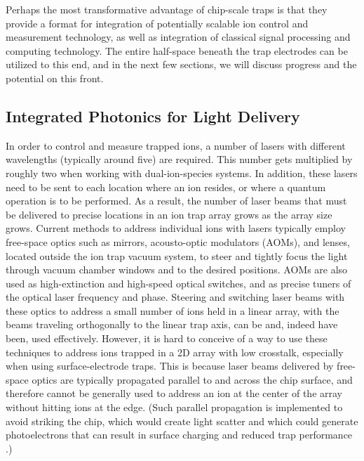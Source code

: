 \documentclass[%
reprint,
 amsmath,amssymb,
]{revtex4-1}
\begin{document}
Perhaps the most transformative advantage of chip-scale traps is that they provide a format for integration of potentially scalable ion control and measurement technology, as well as integration of classical signal processing and computing technology.  The entire half-space beneath the trap electrodes can be utilized to this end, and in the next few sections, we will discuss progress and the potential on this front.

    \subsection{Integrated Photonics for Light Delivery}
    \label{IntPhot}
In order to control and measure trapped ions, a number of lasers with different wavelengths (typically around five) are required.  This number gets multiplied by roughly two when working with dual-ion-species systems.  In addition, these lasers need to be sent to each location where an ion resides, or where a quantum operation is to be performed.  As a result, the number of laser beams that must be delivered to precise locations in an ion trap array grows as the array size grows.  Current methods to address individual ions with lasers typically employ free-space optics such as mirrors, acousto-optic modulators (AOMs), and lenses, located outside the ion trap vacuum system, to steer and tightly focus the light through vacuum chamber windows and to the desired positions.  AOMs are also used as  high-extinction and high-speed optical switches, and as precise tuners of the optical laser frequency and phase.  Steering and switching laser beams with these optics to address a small number of ions held in a linear array, with the beams traveling orthogonally to the linear trap axis, can be and, indeed have been, used effectively.  However, it is hard to conceive of a way to use these techniques to address ions trapped in a 2D array with low crosstalk, especially when using surface-electrode traps.  This is because laser beams delivered by free-space optics are typically propagated parallel to and across the chip surface, and therefore cannot be generally used to address an ion at the center of the array without hitting ions at the edge. (Such parallel propagation is implemented to avoid striking the chip, which would create light scatter and which could generate photoelectrons that can result in surface charging and reduced trap performance \cite{wang2011laser}.)
\end{document}
